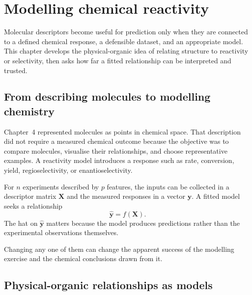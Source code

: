 
\chapter{Modelling chemical reactivity}

\begin{notebox}
  Molecular descriptors become useful for prediction only when they are connected to a defined chemical response, a defensible dataset, and an appropriate model.
  This chapter develops the physical-organic idea of relating structure to reactivity or selectivity, then asks how far a fitted relationship can be interpreted and trusted.
\end{notebox}

\section{From describing molecules to modelling chemistry}

Chapter~4 represented molecules as points in chemical space.
That description did not require a measured chemical outcome because the objective was to compare molecules, visualise their relationships, and choose representative examples.
A reactivity model introduces a response such as rate, conversion, yield, regioselectivity, or enantioselectivity.

For $n$ experiments described by $p$ features, the inputs can be collected in a descriptor matrix $\mathbf{X}$ and the measured responses in a vector $\mathbf{y}$.
A fitted model seeks a relationship
\begin{equation}
  \hat{\mathbf{y}}=f(\mathbf{X}).
\end{equation}
The hat on $\hat{\mathbf{y}}$ matters because the model produces predictions rather than the experimental observations themselves.

\begin{conceptbox}
  Changing any one of them can change the apparent success of the modelling exercise and the chemical conclusions drawn from it.
\end{conceptbox}

\section{Physical-organic relationships as models}


